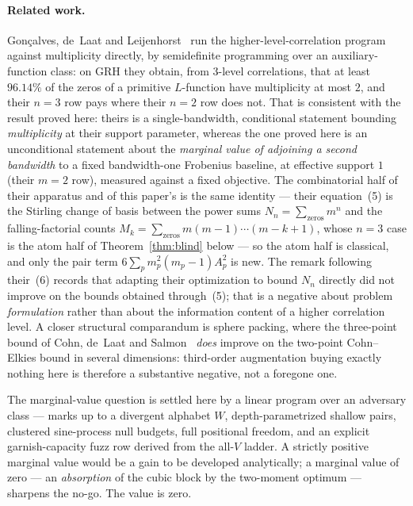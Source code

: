 \documentclass[11pt]{article}
\theoremstyle{plain}
\theoremstyle{definition}
\theoremstyle{remark}
\begin{document}
\paragraph{Related work.}
Gon\c{c}alves, de~Laat and Leijenhorst~\cite{GdLL25} run the
higher-level-correlation program against multiplicity directly, by semidefinite
programming over an auxiliary-function class: on GRH they obtain, from $3$-level
correlations, that at least $96.14\%$ of the zeros of a primitive $L$-function have
multiplicity at most $2$, and their $n = 3$ row pays where their $n = 2$ row does
not. That is consistent with the result proved here: theirs is a
single-bandwidth, conditional statement bounding \emph{multiplicity} at their
support parameter, whereas the one proved here is an unconditional statement
about the \emph{marginal value of adjoining a second bandwidth} to a fixed
bandwidth-one Frobenius baseline, at effective support $1$ (their $m = 2$ row),
measured against a fixed objective. The combinatorial half of their apparatus
and of this paper's is the same identity --- their equation~(5) is the Stirling
change of basis between the power sums $N_n = \sum_{\text{zeros}} m^n$ and the
falling-factorial counts $M_k = \sum_{\text{zeros}} m(m-1)\cdots(m-k+1)$, whose
$n = 3$ case is the atom half of Theorem~\ref{thm:blind} below --- so the atom
half is classical, and only the pair term $6\sum_p m_p^2 (m_p - 1) A_p^2$ is
new. The remark following their~(6) records that adapting their optimization to
bound $N_n$ directly did not improve on the bounds obtained through~(5); that
is a negative about problem \emph{formulation} rather than about the
information content of a higher correlation level. A closer structural
comparandum is sphere packing, where the three-point bound of Cohn, de~Laat and
Salmon~\cite{CdLS22} \emph{does} improve on the two-point Cohn--Elkies bound in
several dimensions: third-order augmentation buying exactly nothing here is
therefore a substantive negative, not a foregone one.

The marginal-value question is settled here by a linear program over an
adversary class --- marks up to a divergent alphabet $W$,
depth-parametrized shallow pairs, clustered sine-process null budgets, full
positional freedom, and an explicit garnish-capacity fuzz row derived from the
all-$V$ ladder. A strictly positive marginal value would be a gain to be
developed analytically; a marginal value of zero --- an \emph{absorption} of the
cubic block by the two-moment optimum --- sharpens the no-go. The value is zero.
\end{document}

